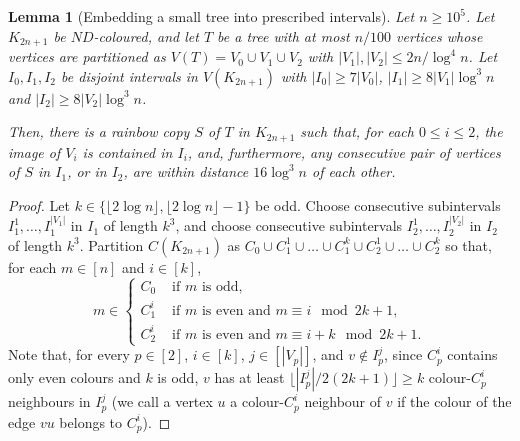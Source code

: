 \documentclass{article}
\newtheorem{lemma}{Lemma}[section]
\theoremstyle{definition}
\begin{document}
\begin{lemma}[Embedding a small tree into prescribed intervals]\label{Lemma_small_tree}
Let $n\geq 10^5$.
Let $K_{2n+1}$ be $ND$-coloured, and let $T$ be a tree with at most $n/100$ vertices whose vertices are partitioned as  $V(T)=V_0\cup V_1\cup V_2$ with $|V_1|, |V_2|\leq 2n/\log^4 n$.
Let $I_0, I_1, I_2$ be disjoint intervals in $V(K_{2n+1})$ with $|I_0|\geq 7|V_0|$, $|I_1|\geq 8|V_1|\log^3 n $ and $|I_2|\geq 8|V_2|\log^3 n $.

Then, there is a rainbow copy $S$ of $T$ in $K_{2n+1}$ such that, for each $0\leq i\leq 2$, the image of $V_i$ is contained in $I_i$, and, furthermore, any consecutive pair of vertices of $S$ in $I_1$, or in $I_2$, are within distance $16\log^3 n$ of each other.
\end{lemma}
\begin{proof}
Let $k\in \{\lfloor 2\log n\rfloor,\lfloor 2\log n\rfloor-1\}$ be odd.
Choose   consecutive subintervals $I_1^{1}, \dots, I_1^{|V_1|}$ in $I_1$ of length $k^3$, and choose consecutive subintervals $I_2^{1}, \dots, I_2^{|V_2|}$   in $I_2$ of length $k^3$.
Partition $C(K_{2n+1})$ as $C_0\cup C_1^{1}\cup \dots\cup C_1^{k}\cup C_2^{1}\cup \dots\cup C_2^{k}$ so that, for each $m\in [n]$ and $i\in [k]$,
\[
m\in \left\{\begin{array}{ll}
C_0 & \text{ if }m\text{ is odd},\\
C_1^i & \text{ if }m\text{ is even and }m\equiv i\mod{2k+1},\\
C_2^i & \text{ if }m\text{ is even and }m\equiv i+k\mod{2k+1}.
\end{array}
\right.
\]
Note that, for every $p\in [2]$, $i\in [k]$, $j\in [|V_p|]$, and $v\notin I_p^j$, since $C_p^i$ contains only even colours and $k$ is odd, $v$ has at least $\lfloor |I_p^j|/2(2k+1)\rfloor\geq k$ colour-$C_p^i$ neighbours in $I_p^j$ (we call a vertex $u$ a colour-$C_p^i$ neighbour of $v$ if the colour of the edge $vu$ belongs to $C_p^i$).



\end{proof}
\end{document}

